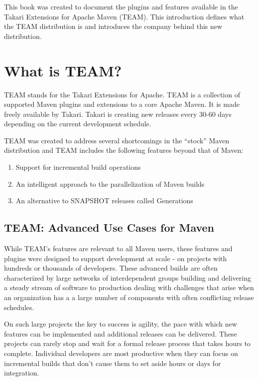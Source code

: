 \documentclass[a4paper]{book}
\begin{document}
This book was created to document the plugins and features available in the Takari Extensions for Apache Maven (TEAM). This introduction defines what the TEAM distribution is and introduces the company behind this new distribution.

\section{What is TEAM?}\label{what-is-team}

TEAM stands for the Takari Extensions for Apache. TEAM is a collection of supported Maven plugins and extensions to a core Apache Maven. It is made freely available by Takari. Takari is creating new releases every 30-60 days depending on the current development schedule.

TEAM was created to address several shortcomings in the “stock” Maven distribution and TEAM includes the following features beyond that of Maven:

\begin{enumerate}
\def\labelenumi{\arabic{enumi}.}
\item
  Support for incremental build operations
\item
  An intelligent approach to the parallelization of Maven builds
\item
  An alternative to SNAPSHOT releases called Generations
\end{enumerate}

\subsection{TEAM: Advanced Use Cases for Maven}\label{team-advanced-use-cases-for-maven}

While TEAM's features are relevant to all Maven users, these features and plugins were designed to support development at scale - on projects with hundreds or thousands of developers. These advanced builds are often characterized by large networks of interdependent groups building and delivering a steady stream of software to production dealing with challenges that arise when an organization has a a large number of components with often conflicting release schedules.

On such large projects the key to success is agility, the pace with which new features can be implemented and additional releases can be delivered. These projects can rarely stop and wait for a formal release process that takes hours to complete. Individual developers are most productive when they can focus on incremental builds that don't cause them to set aside hours or days for integration.
\end{document}
